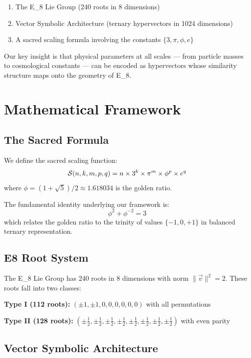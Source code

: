 \documentclass[12pt,a4paper]{article}
\newcommand{\EIGHT}{{\rm E}_8}
\newcommand{\sacred}{{\cal S}}
\begin{document}
\begin{enumerate}
\item The \EIGHT{} Lie Group (240 roots in 8 dimensions)
\item Vector Symbolic Architecture (ternary hypervectors in 1024 dimensions)
\item A sacred scaling formula involving the constants $\{3, \pi, \phi, e\}$
\end{enumerate}

Our key insight is that physical parameters at all scales — from particle masses to cosmological constants — can be encoded as hypervectors whose similarity structure maps onto the geometry of \EIGHT.

\section{Mathematical Framework}

\subsection{The Sacred Formula}

We define the sacred scaling function:
\begin{equation}
\sacred(n,k,m,p,q) = n \times 3^k \times \pi^m \times \phi^p \times e^q
\end{equation}
where $\phi = (1+\sqrt{5})/2 \approx 1.618034$ is the golden ratio.

The fundamental identity underlying our framework is:
\begin{equation}
\phi^2 + \phi^{-2} = 3
\end{equation}
which relates the golden ratio to the trinity of values $\{-1, 0, +1\}$ in balanced ternary representation.

\subsection{E8 Root System}

The \EIGHT{} Lie Group has 240 roots in 8 dimensions with norm $\|\vec{v}\|^2 = 2$. These roots fall into two classes:

\textbf{Type I (112 roots):} $(\pm 1, \pm 1, 0, 0, 0, 0, 0, 0)$ with all permutations

\textbf{Type II (128 roots):} $(\pm \tfrac12, \pm \tfrac12, \pm \tfrac12, \pm \tfrac12, \pm \tfrac12, \pm \tfrac12, \pm \tfrac12, \pm \tfrac12)$ with even parity

\subsection{Vector Symbolic Architecture}
\end{document}
